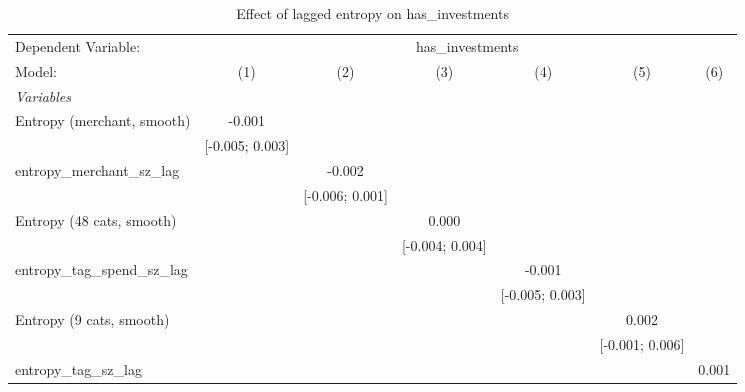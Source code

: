 
\begin{table}[htbp]
   \centering
   \tiny
   \begin{threeparttable}[b]
      \caption{\label{tab:reg_has_investments_lagged_sz} Effect of lagged entropy on has\_investments}
      \begin{tabular}{lcccccc}
         \tabularnewline \midrule \midrule
         Dependent Variable: & \multicolumn{6}{c}{has\_investments}\\
         Model:                           & (1)             & (2)             & (3)             & (4)             & (5)             & (6)\\  
         \midrule
         \emph{Variables}\\
         Entropy (merchant, smooth)       & -0.001          &                 &                 &                 &                 &   \\   
                                          & [-0.005; 0.003] &                 &                 &                 &                 &   \\   
         entropy\_merchant\_sz\_lag       &                 & -0.002          &                 &                 &                 &   \\   
                                          &                 & [-0.006; 0.001] &                 &                 &                 &   \\   
         Entropy (48 cats, smooth)        &                 &                 & 0.000           &                 &                 &   \\   
                                          &                 &                 & [-0.004; 0.004] &                 &                 &   \\   
         entropy\_tag\_spend\_sz\_lag     &                 &                 &                 & -0.001          &                 &   \\   
                                          &                 &                 &                 & [-0.005; 0.003] &                 &   \\   
         Entropy (9 cats, smooth)         &                 &                 &                 &                 & 0.002           &   \\   
                                          &                 &                 &                 &                 & [-0.001; 0.006] &   \\   
         entropy\_tag\_sz\_lag            &                 &                 &                 &                 &                 & 0.001\\   

\end{tabular}
\end{threeparttable}
\end{table}
